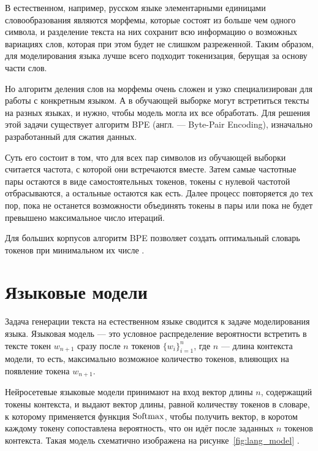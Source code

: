 В естественном, например, русском языке элементарными единицами словообразования являются морфемы, которые состоят из больше чем одного символа, и разделение текста на них сохранит всю информацию о возможных вариациях слов, которая при этом будет не слишком разреженной. Таким образом, для моделирования языка лучше всего подходит токенизация, берущая за основу части слов.

Но алгоритм деления слов на морфемы очень сложен и узко специализирован для работы с конкретным языком. А в обучающей выборке могут встретиться тексты на разных языках, и нужно, чтобы модель могла их все обработать. Для решения этой задачи существует алгоритм BPE (англ. --- Byte-Pair Encoding), изначально разработанный для сжатия данных.

Суть его состоит в том, что для всех пар символов из обучающей выборки считается частота, с которой они встречаются вместе. Затем самые частотные пары остаются в виде самостоятельных токенов, токены с нулевой частотой отбрасываются, а остальные остаются как есть. Далее процесс повторяется до тех пор, пока не останется возможности объединять токены в пары или пока не будет превышено максимальное число итераций.

Для больших корпусов алгоритм BPE позволяет создать оптимальный словарь токенов при минимальном их числе \cite{art:bpe}.

\section{Языковые модели}

Задача генерации текста на естественном языке сводится к задаче моделирования языка. Языковая модель --- это условное распределение вероятности встретить в тексте токен $w_{n+1}$ сразу после $n$ токенов $\{w_i\}_{i=1}^n$, где $n$ --- длина контекста модели, то есть, максимально возможное количество токенов, влияющих на появление токена $w_{n+1}$.

Нейросетевые языковые модели принимают на вход вектор длины $n$, содержащий токены контекста, и выдают вектор длины, равной количеству токенов в словаре, к которому применяется функция $\operatorname{Softmax}$, чтобы получить вектор, в коротом каждому токену сопоставлена вероятность, что он идёт после заданных $n$ токенов контекста. Такая модель схематично изображена на рисунке \ref*{fig:lang_model} \cite{art:lang_models}.

